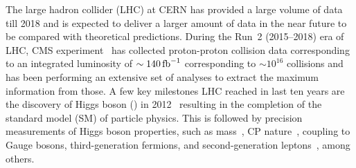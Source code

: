 \documentclass[a4paper,11pt]{article}
\newcommand{\Pb}{{{\Pqb}}\xspace}
\newcommand{\Pt}{{{\Pqt}}\xspace}
\newcommand{\Ps}{{{\Pqs}}\xspace}
\newcommand{\Pc}{{{\Pqc}}\xspace}
\newcommand{\Pd}{{{\Pqd}}\xspace}
\newcommand{\Pu}{{{\Pqu}}\xspace}
\begin{document}
The large hadron collider (LHC) at CERN has provided a large volume of data till 2018
and is expected to deliver a larger amount of data in the near future
to be compared with theoretical predictions. 
During the Run~2 (2015--2018) era of LHC, CMS experiment~\cite{CMS_ex} has collected proton-proton collision data corresponding to an integrated luminosity of $\sim 140\mbox{\ensuremath{\,\text{fb}^{-1}}}$ corresponding to $\sim 10^{16}$ collisions and has been performing an extensive set of analyses to extract the maximum information from those.
A few key milestones LHC reached in last ten years are the discovery of Higgs boson (\PH) in 2012~\cite{Aad:2012tfa,Chatrchyan:2012ufa} resulting in the completion of the standard model (SM) of particle physics. 
This is followed by precision measurements of Higgs boson properties, such as mass~\cite{CMS:2017dib,CMS:2020xrn}, CP nature~\cite{CMS:2019jdw,CMS:2020cga}, coupling to Gauge bosons, third-generation fermions, and second-generation leptons~\cite{CMS-PAS-HIG-19-005}, among others.

\end{document}
